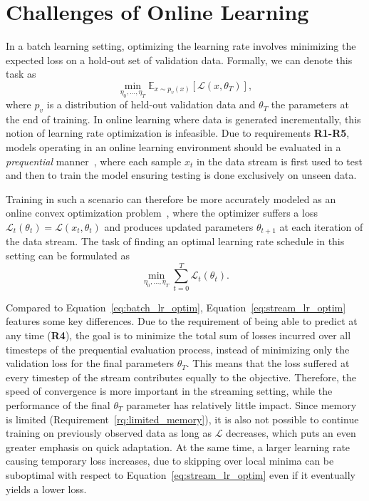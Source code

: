 \documentclass[runningheads]{llncs}
\begin{document}
\section{Challenges of Online Learning}\label{sec:diffs_batch_online}

In a batch learning setting, optimizing the learning rate involves minimizing the expected loss on a hold-out set of validation data.
Formally, we can denote this task as
\begin{equation}
	\label{eq:batch_lr_optim}
	\min_{\eta_0, \ldots, \eta_T} \mathbb{E}_{x \sim p_v(x)}[\mathcal{L}(x, \theta_T)],
\end{equation}
where $p_v$ is a distribution of held-out validation data and $\theta_T$ the parameters at the end of training.
In online learning where data is generated incrementally, this notion of learning rate optimization is infeasible.
Due to requirements \textbf{R1-R5}, models operating in an online learning environment should be evaluated in a \textit{prequential} manner~\cite{bifetMOAMassiveOnline2010}, where each sample $x_t$ in the data stream is first used to test and then to train the model ensuring testing is done exclusively on unseen data.

Training in such a scenario can therefore be more accurately modeled as an online convex optimization problem~\cite{shalev-shwartzOnlineLearningOnline2011,hazanIntroductionOnlineConvex2016}, where the optimizer suffers a loss $\mathcal{L}_t(\theta_t) = \mathcal{L}(x_t, \theta_{t})$ and produces updated parameters $\theta_{t+1}$ at each iteration of the data stream.
The task of finding an optimal learning rate schedule in this setting can be formulated as
\begin{equation}
	\label{eq:stream_lr_optim}
	\min_{\eta_0, \ldots, \eta_T} \sum_{t=0}^{T} \mathcal{L}_t(\theta_t).
\end{equation}

Compared to Equation~\eqref{eq:batch_lr_optim}, Equation~\eqref{eq:stream_lr_optim} features some key differences.
Due to the requirement of being able to predict at any time (\textbf{R4}), the goal is to minimize the total sum of losses incurred over all timesteps of the prequential evaluation process, instead of minimizing only the validation loss for the final parameters $\theta_T$.
This means that the loss suffered at every timestep of the stream contributes equally to the objective.
Therefore, the speed of convergence is more important in the streaming setting, while the performance of the final $\theta_T$ parameter has relatively little impact.
Since memory is limited (Requirement~\ref{rq:limited_memory}), it is also not possible to continue training on previously observed data as long as $\mathcal{L}$ decreases, which puts an even greater emphasis on quick adaptation.
At the same time, a larger learning rate causing temporary loss increases, due to skipping over local minima can be suboptimal with respect to Equation~\eqref{eq:stream_lr_optim} even if it eventually yields a lower loss.
\end{document}
